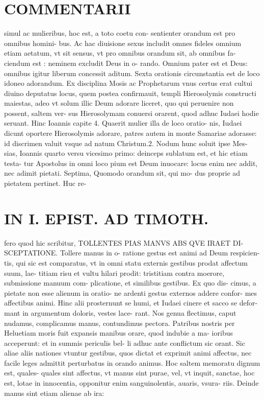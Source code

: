 \documentclass{article}
\begin{document}
\begin{pages}
\section*{COMMENTARII }
\marginpar{[ p.52 ]}\pstart simul ac mulieribus, hoc est, a toto coetu con- sentienter orandum est pro omnibus homini- bus. Ac hac diuisione sexus includit omnes fideles omnium etiam aetatum, vt sit sensus, vt pro omnibus orandum sit, ab omnibus fa- ciendum est : neminem excludit Deus in o- rando. Omnium pater est et Deus: omnibus igitur liberum concessit aditum.  \pend\pstart Sexta orationis circunstantia est de loco idoneo adorandum. Ex disciplina Mosis ac Prophetarum vnus certus erat cultui diuino deputatus locus, quem postea confirmauit, templi Hierosolymis constructi maiestas, adeo vt solum illic Deum adorare liceret, quo qui peruenire non possent, saltem ver- sus Hierosolymam conuersi orarent, quod adhuc Iudaei hodie seruant. Hinc Ioannis capite 4. Quaerit mulier illa de loco oratio- nis, Iudaei dicunt oportere Hierosolymis adorare, patres autem in monte Samariae adorasse: id discrimen valuit vsque ad natum Christum.2. Nodum hunc soluit ipse Mes- sias, Ioannis quarto versu vicesimo primo: deinceps sublatum est, et hic etiam testa- tur Apostolus in omni loco pium est Deum inuocare: locus enim nec addit, nec adimit pietati.  \pend\pstart Septima, Quomodo orandum sit, qui mo- dus proprie ad pietatem pertinet. Huc re-  \pend
\section*{IN I. EPIST. AD TIMOTH. }
\marginpar{[ p.53 ]}\pstart fero quod hic scribitur, TOLLENTES PIAS MANVS ABS QVE IRAET DI- SCEPTATIONE. Tollere manus in o- ratione gestus est animi ad Deum respicien- tis, qui sic est comparatus, vt in omni statu externis gestibus prodat affectum suum, lae- titiam risu et vultu hilari prodit: tristitiam contra moerore, submissione manuum com- plicatione, et similibus gestibus. Ex quo dis- cimus, a pietate non esse alienum in oratio- ne ardenti gestus externos addere confor- mes affectibus animi. Hinc alii prosternunt se humi, et Iudaei cinere et sacco se defor- mant in argumentum doloris, vestes lace- rant. Nos genua flectimus, caput nudamus, complicamus manus, contundimus pectora. Patribus nostris per Heluetiam moris fuit expansis manibus orare, quod indubie a ma- ioribus acceperunt: et in summis periculis bel- li adhuc ante conflictum sic orant.  \pend\pstart Sic aliae aliis nationes vtuntur gestibus, quos dictat et exprimit animi affectus, nec facile leges admittit perturbatus in orando animus.  \pend\pstart Hoc saltem memoratu dignum est, quales- quales sint affectus, vt manus sint purae, vel, vt inquit, sanctae, hoc est, lotae in innocentia, opponitur enim sanguinolentis, auaris, vsura- riis. Deinde manus sint etiam alienae ab ira:  \pend

\end{pages}
\end{document}
